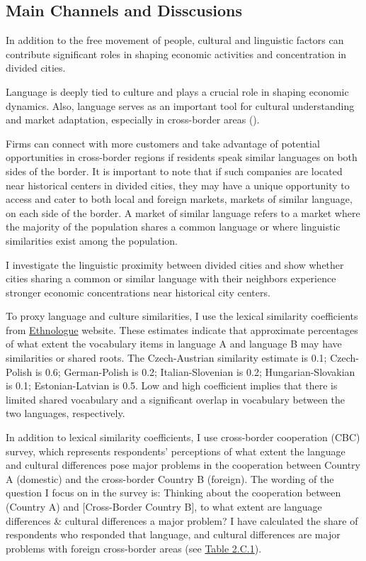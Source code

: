 \documentclass[12pt]{article}    %
\begin{document}
\subsection{Main Channels and Disscusions}
\par In addition to the free movement of people,  cultural and linguistic factors can contribute significant roles in shaping economic activities and concentration in divided cities. 

\par Language is deeply tied to culture and plays a crucial role in shaping economic dynamics. Also, language serves as an important tool for cultural understanding and market adaptation, especially in cross-border areas (\citealp{european2015cross}).




\par Firms can connect with more customers and take advantage of potential opportunities in cross-border regions if residents speak similar languages on both sides of the border. It is important to note that if such companies are located near historical centers in divided cities, they may have a unique opportunity to access and cater to both local and foreign markets, markets of similar language, on each side of the border. A market of similar language refers to a market where the majority of the population shares a common language or where linguistic similarities exist among the population.

\par  I investigate the linguistic proximity between divided cities and show whether cities sharing a common or similar language with their neighbors experience stronger economic concentrations near historical city centers.  



\par To proxy language and culture similarities, I use the lexical similarity coefficients from \href{https://www.ethnologue.com}{Ethnologue} website. These estimates indicate that approximate percentages of what extent the vocabulary items in language A and language B may have similarities or shared roots. The Czech-Austrian  similarity estimate is 0.1; Czech-Polish is 0.6; German-Polish is 0.2; Italian-Slovenian is 0.2; Hungarian-Slovakian is 0.1; Estonian-Latvian is 0.5. Low and high coefficient implies that there is limited shared vocabulary and a significant overlap in vocabulary  between the two languages, respectively.


\par In addition to lexical similarity coefficients, I use cross-border cooperation (CBC) survey, which represents respondents' perceptions of what extent the language and cultural differences pose major problems in the cooperation between Country A (domestic) and the cross-border Country B (foreign). The wording of the question I focus on in the survey is: Thinking about the cooperation between (Country A) and [Cross-Border Country B], to what extent are language differences \& cultural differences a  major problem? I have calculated the share of respondents who responded that language, and cultural differences are major problems with foreign cross-border areas (see \hyperlink{Table 2.C.1}{Table 2.C.1}). 
\end{document}

